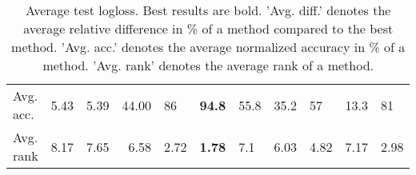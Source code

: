 \begin{table}[ht!]
\begin{tabular}{lllrlllllll}
  Avg. acc. & 5.43 & 5.39 & 44.00 & 86 & \textbf{94.8} & 55.8 & 35.2 & 57 & 13.3 & 81 \\ 
  Avg. rank & 8.17 & 7.65 & 6.58 & 2.72 & \textbf{1.78} & 7.1 & 6.03 & 4.82 & 7.17 & 2.98 \\ 
   \hline
\hline
\end{tabular}
\endgroup
\caption{Average test logloss. 
                  Best results are bold. 
                  'Avg. diff.' denotes the average relative difference in \% of a method compared to the best method.
                  'Avg. acc.' denotes the average normalized accuracy in \% of a method.
                  'Avg. rank' denotes the average rank of a method.} 
\label{TABLES/table_results_logloss}
\end{table}
